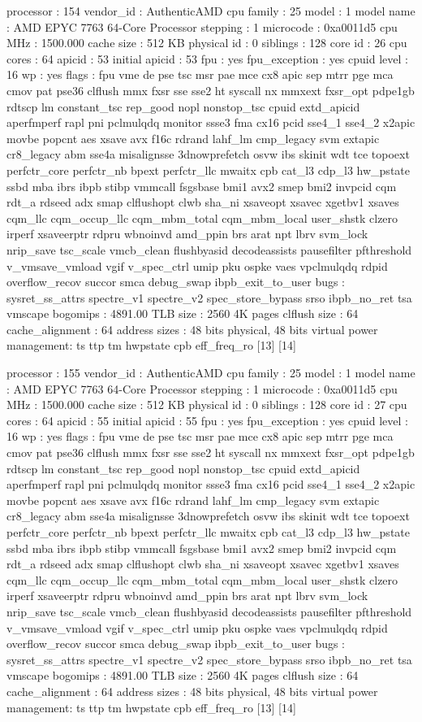 processor	: 154
vendor_id	: AuthenticAMD
cpu family	: 25
model		: 1
model name	: AMD EPYC 7763 64-Core Processor
stepping	: 1
microcode	: 0xa0011d5
cpu MHz		: 1500.000
cache size	: 512 KB
physical id	: 0
siblings	: 128
core id		: 26
cpu cores	: 64
apicid		: 53
initial apicid	: 53
fpu		: yes
fpu_exception	: yes
cpuid level	: 16
wp		: yes
flags		: fpu vme de pse tsc msr pae mce cx8 apic sep mtrr pge mca cmov pat pse36 clflush mmx fxsr sse sse2 ht syscall nx mmxext fxsr_opt pdpe1gb rdtscp lm constant_tsc rep_good nopl nonstop_tsc cpuid extd_apicid aperfmperf rapl pni pclmulqdq monitor ssse3 fma cx16 pcid sse4_1 sse4_2 x2apic movbe popcnt aes xsave avx f16c rdrand lahf_lm cmp_legacy svm extapic cr8_legacy abm sse4a misalignsse 3dnowprefetch osvw ibs skinit wdt tce topoext perfctr_core perfctr_nb bpext perfctr_llc mwaitx cpb cat_l3 cdp_l3 hw_pstate ssbd mba ibrs ibpb stibp vmmcall fsgsbase bmi1 avx2 smep bmi2 invpcid cqm rdt_a rdseed adx smap clflushopt clwb sha_ni xsaveopt xsavec xgetbv1 xsaves cqm_llc cqm_occup_llc cqm_mbm_total cqm_mbm_local user_shstk clzero irperf xsaveerptr rdpru wbnoinvd amd_ppin brs arat npt lbrv svm_lock nrip_save tsc_scale vmcb_clean flushbyasid decodeassists pausefilter pfthreshold v_vmsave_vmload vgif v_spec_ctrl umip pku ospke vaes vpclmulqdq rdpid overflow_recov succor smca debug_swap ibpb_exit_to_user
bugs		: sysret_ss_attrs spectre_v1 spectre_v2 spec_store_bypass srso ibpb_no_ret tsa vmscape
bogomips	: 4891.00
TLB size	: 2560 4K pages
clflush size	: 64
cache_alignment	: 64
address sizes	: 48 bits physical, 48 bits virtual
power management: ts ttp tm hwpstate cpb eff_freq_ro [13] [14]

processor	: 155
vendor_id	: AuthenticAMD
cpu family	: 25
model		: 1
model name	: AMD EPYC 7763 64-Core Processor
stepping	: 1
microcode	: 0xa0011d5
cpu MHz		: 1500.000
cache size	: 512 KB
physical id	: 0
siblings	: 128
core id		: 27
cpu cores	: 64
apicid		: 55
initial apicid	: 55
fpu		: yes
fpu_exception	: yes
cpuid level	: 16
wp		: yes
flags		: fpu vme de pse tsc msr pae mce cx8 apic sep mtrr pge mca cmov pat pse36 clflush mmx fxsr sse sse2 ht syscall nx mmxext fxsr_opt pdpe1gb rdtscp lm constant_tsc rep_good nopl nonstop_tsc cpuid extd_apicid aperfmperf rapl pni pclmulqdq monitor ssse3 fma cx16 pcid sse4_1 sse4_2 x2apic movbe popcnt aes xsave avx f16c rdrand lahf_lm cmp_legacy svm extapic cr8_legacy abm sse4a misalignsse 3dnowprefetch osvw ibs skinit wdt tce topoext perfctr_core perfctr_nb bpext perfctr_llc mwaitx cpb cat_l3 cdp_l3 hw_pstate ssbd mba ibrs ibpb stibp vmmcall fsgsbase bmi1 avx2 smep bmi2 invpcid cqm rdt_a rdseed adx smap clflushopt clwb sha_ni xsaveopt xsavec xgetbv1 xsaves cqm_llc cqm_occup_llc cqm_mbm_total cqm_mbm_local user_shstk clzero irperf xsaveerptr rdpru wbnoinvd amd_ppin brs arat npt lbrv svm_lock nrip_save tsc_scale vmcb_clean flushbyasid decodeassists pausefilter pfthreshold v_vmsave_vmload vgif v_spec_ctrl umip pku ospke vaes vpclmulqdq rdpid overflow_recov succor smca debug_swap ibpb_exit_to_user
bugs		: sysret_ss_attrs spectre_v1 spectre_v2 spec_store_bypass srso ibpb_no_ret tsa vmscape
bogomips	: 4891.00
TLB size	: 2560 4K pages
clflush size	: 64
cache_alignment	: 64
address sizes	: 48 bits physical, 48 bits virtual
power management: ts ttp tm hwpstate cpb eff_freq_ro [13] [14]

